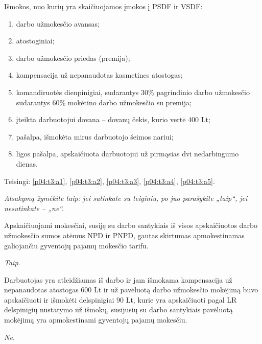 \begin{tasks}
  \begin{task}
    \begin{condition}
      Išmokos, nuo kurių yra skaičiuojamos įmokos į PSDF ir VSDF:
      \begin{enumerate}
        \item \label{p04:t3:a1} darbo užmokesčio avansas;
        \item \label{p04:t3:a2} atostoginiai;
        \item \label{p04:t3:a3} darbo užmokesčio priedas (premija);
        \item \label{p04:t3:a4} kompensacija už nepanaudotas kasmetines
          atostogas;
        \item \label{p04:t3:a5} komandiruotės dienpinigiai, sudarantys
          30\% pagrindinio darbo užmokesčio sudarantys 60\% mokėtino
          darbo užmokesčio su premija;
        \item \label{p04:t3:a6} įteikta darbuotojui dovana – dovanų
          čekis, kurio vertė 400 Lt;
        \item \label{p04:t3:a7} pašalpa, išmokėta mirus darbuotojo
          šeimos nariui;
        \item \label{p04:t3:a8} ligos pašalpa, apskaičiuota
          darbuotojui už pirmąsias dvi nedarbingumo dienas.
      \end{enumerate}
    \end{condition}
    \begin{solution}
      Teisingi: \ref{p04:t3:a1}, \ref{p04:t3:a2}, \ref{p04:t3:a3},
      \ref{p04:t3:a4}, \ref{p04:t3:a5}.
    \end{solution}
  \end{task}

  \emph{Atsakymą žymėkite taip: jei sutinkate su teiginiu, po
  juo parašykite „taip“, jei nesutinkate – „ne“.}

  \begin{task}
    \begin{condition}
      Apskaičiuojami mokesčiai, susiję su darbo santykiais iš visos
      apskaičiuotos darbo užmokesčio sumos atėmus NPD ir PNPD,
      gautas skirtumas apmokestinamas galiojančiu gyventojų pajamų
      mokesčio tarifu.
    \end{condition}
    \begin{solution}
      \emph{Taip.}
    \end{solution}
  \end{task}

  \begin{task}
    \begin{condition} 
      Darbuotojas yra atleidžiamas iš darbo ir jam išmokama
      kompensacija už nepanaudotas atostogas 600 Lt ir už pavėluotą
      darbo užmokesčio mokėjimą buvo apskaičiuoti ir išmokėti
      delspinigiai 90 Lt, kurie yra apskaičiuoti pagal LR
      delspinigių nustatymo už išmokų, susijusių su darbo santykiais
      pavėluotą mokėjimą yra apmokestinami gyventojų pajamų
      mokesčiu.
    \end{condition}
    \begin{solution}
      \emph{Ne.}
    \end{solution}
  \end{task}


\end{tasks}
